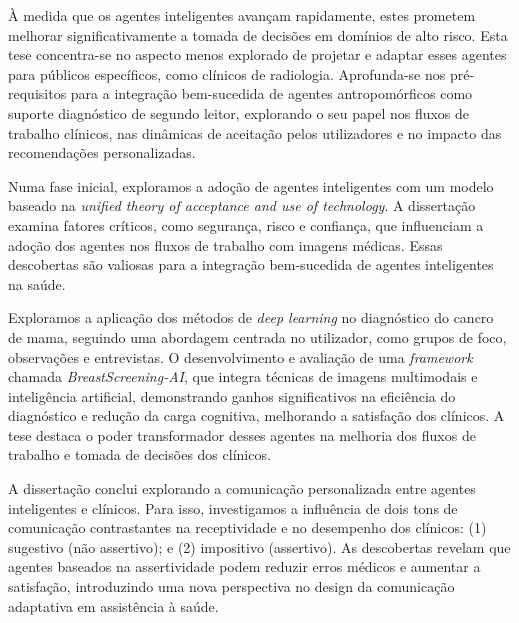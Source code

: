 
\vspace*{-7.50mm}%

\`{A} medida que os agentes inteligentes avan\c{c}am rapidamente, estes prometem melhorar significativamente a tomada de decis\~{o}es em dom\'{i}nios de alto risco.
Esta tese concentra-se no aspecto menos explorado de projetar e adaptar esses agentes para p\'{u}blicos espec\'{i}ficos, como cl\'{i}nicos de radiologia.
Aprofunda-se nos pr\'{e}-requisitos para a integra\c{c}\~{a}o bem-sucedida de agentes antropom\'{o}rficos como suporte diagn\'{o}stico de segundo leitor, explorando o seu papel nos fluxos de trabalho cl\'{i}nicos, nas din\^{a}micas de aceita\c{c}\~{a}o pelos utilizadores e no impacto das recomenda\c{c}\~{o}es personalizadas.

Numa fase inicial, exploramos a ado\c{c}\~{a}o de agentes inteligentes com um modelo baseado na {\it unified theory of acceptance and use of technology}.
A disserta\c{c}\~{a}o examina fatores cr\'{i}ticos, como seguran\c{c}a, risco e confian\c{c}a, que influenciam a ado\c{c}\~{a}o dos agentes nos fluxos de trabalho com imagens m\'{e}dicas.
Essas descobertas s\~{a}o valiosas para a integra\c{c}\~{a}o bem-sucedida de agentes inteligentes na sa\'{u}de.

Exploramos a aplica\c{c}\~{a}o dos m\'{e}todos de {\it deep learning} no diagn\'{o}stico do cancro de mama, seguindo uma abordagem centrada no utilizador, como grupos de foco, observa\c{c}\~{o}es e entrevistas.
O desenvolvimento e avalia\c{c}\~{a}o de uma {\it framework} chamada \textit{BreastScreening-AI}, que integra t\'{e}cnicas de imagens multimodais e intelig\^{e}ncia artificial, demonstrando ganhos significativos na efici\^{e}ncia do diagn\'{o}stico e redu\c{c}\~{a}o da carga cognitiva, melhorando a satisfa\c{c}\~{a}o dos cl\'{i}nicos.
A tese destaca o poder transformador desses agentes na melhoria dos fluxos de trabalho e tomada de decis\~{o}es dos cl\'{i}nicos.

A disserta\c{c}\~{a}o conclui explorando a comunica\c{c}\~{a}o personalizada entre agentes inteligentes e cl\'{i}nicos.
Para isso, investigamos a influ\^{e}ncia de dois tons de comunica\c{c}\~{a}o contrastantes na receptividade e no desempenho dos cl\'{i}nicos:
(1) sugestivo (n\~{a}o assertivo); e
(2) impositivo (assertivo).
As descobertas revelam que agentes baseados na assertividade podem reduzir erros m\'{e}dicos e aumentar a satisfa\c{c}\~{a}o, introduzindo uma nova perspectiva no design da comunica\c{c}\~{a}o adaptativa em assist\^{e}ncia \`{a} sa\'{u}de.

